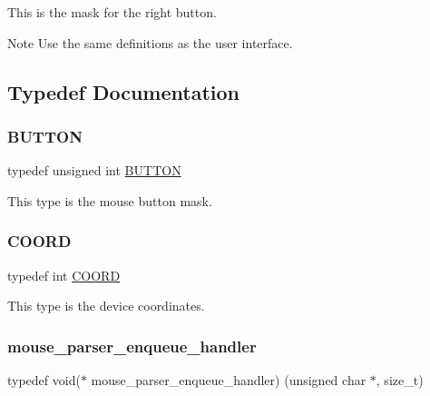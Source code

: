 This is the mask for the right button.

\begin{DoxyNote}{Note}
Use the same definitions as the user interface. 
\end{DoxyNote}


\subsection{Typedef Documentation}
\mbox{\label{group__libmisc__mouseparser_ga07e20c1150a01a90e2cb12dcb752f969}} 
\subsubsection{\texorpdfstring{BUTTON}{BUTTON}}
{\footnotesize\ttfamily typedef unsigned int \mbox{\hyperlink{group__libmisc__mouseparser_ga07e20c1150a01a90e2cb12dcb752f969}{B\+U\+T\+T\+ON}}}

This type is the mouse button mask. \mbox{\label{group__libmisc__mouseparser_ga91efc26ca15050f533dd86e543b8ecdd}} 
\subsubsection{\texorpdfstring{COORD}{COORD}}
{\footnotesize\ttfamily typedef int \mbox{\hyperlink{group__libmisc__mouseparser_ga91efc26ca15050f533dd86e543b8ecdd}{C\+O\+O\+RD}}}

This type is the device coordinates. \mbox{\label{group__libmisc__mouseparser_gaf26702b93b78d291461e340effca0fcc}} 
\subsubsection{\texorpdfstring{mouse\_parser\_enqueue\_handler}{mouse\_parser\_enqueue\_handler}}
{\footnotesize\ttfamily typedef void($\ast$ mouse\+\_\+parser\+\_\+enqueue\+\_\+handler) (unsigned char $\ast$, size\+\_\+t)}

